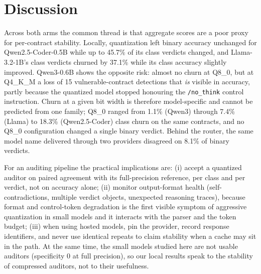 \section{Discussion}\label{sec:discussion}
Across both arms the common thread is that aggregate scores are a poor proxy for per-contract stability. Locally, quantization left binary accuracy unchanged for Qwen2.5-Coder-0.5B while up to 45.7\% of its class verdicts changed, and Llama-3.2-1B's class verdicts churned by 37.1\% while its class accuracy slightly improved. Qwen3-0.6B shows the opposite risk: almost no churn at Q8\_0, but at Q4\_K\_M a loss of 15 vulnerable-contract detections that \emph{is} visible in accuracy, partly because the quantized model stopped honouring the \texttt{/no\_think} control instruction. Churn at a given bit width is therefore model-specific and cannot be predicted from one family; Q8\_0 ranged from 1.1\% (Qwen3) through 7.4\% (Llama) to 18.3\% (Qwen2.5-Coder) class churn on the same contracts, and no Q8\_0 configuration changed a single binary verdict.
Behind the router, the same model name delivered through two providers disagreed on 8.1\% of binary verdicts.

For an auditing pipeline the practical implications are: (i) accept a quantized auditor on paired agreement with its full-precision reference, per class and per verdict, not on accuracy alone; (ii) monitor output-format health (self-contradictions, multiple verdict objects, unexpected reasoning traces), because format and control-token degradation is the first visible symptom of aggressive quantization in small models and it interacts with the parser and the token budget; (iii) when using hosted models, pin the provider, record response identifiers, and never use identical repeats to claim stability when a cache may sit in the path. At the same time, the small models studied here are not usable auditors (specificity 0 at full precision), so our local results speak to the stability of compressed auditors, not to their usefulness.

